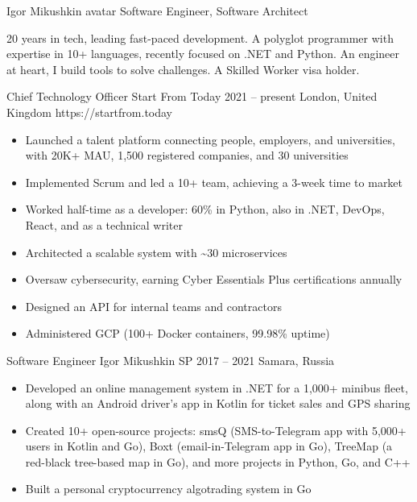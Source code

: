 \documentclass[9pt,a4paper]{juicv}
\begin{document}
\begin{paracol}{2}
\cvMakeHeader
    {Igor Mikushkin}
    {avatar}
    {Software Engineer, Software Architect}

    20 years in tech, leading fast-paced development.
    A polyglot programmer with expertise in 10+ languages, recently focused on .NET and Python.
    An engineer at heart, I build tools to solve challenges.
    A Skilled Worker visa holder.

    \cvLeftEvent
        {Chief Technology Officer}
        {Start From Today}
        {2021 -- present}
        {London, United Kingdom}
        {https://startfrom.today}

        \begin{itemize}
            \item Launched a talent platform connecting people, employers, and universities,
                  with 20K+ MAU, 1,500 registered companies, and 30 universities
            \item Implemented Scrum and led a 10+ team,
                  achieving a 3-week time to market
            \item Worked half-time as a developer: 60\% in Python,
                  also in .NET, DevOps, React, and as a technical writer
            \item Architected a scalable system with \textasciitilde 30 microservices
            \item Oversaw cybersecurity, earning Cyber Essentials Plus certifications annually
            \item Designed an API for internal teams and contractors
            \item Administered GCP (100+ Docker containers, 99.98\% uptime)
        \end{itemize}

    \cvLeftEvent
        {Software Engineer}
        {Igor Mikushkin SP}
        {2017 -- 2021}
        {Samara, Russia}
        {}

        \begin{itemize}
            \item Developed an online management system in .NET for a 1,000+ minibus fleet,
                  along with an Android driver’s app in Kotlin for ticket sales and GPS sharing
            \item Created 10+ open-source projects:
                  smsQ (SMS-to-Telegram app with 5,000+ users in Kotlin and Go),
                  Boxt (email-in-Telegram app in Go),
                  TreeMap (a red-black tree-based map in Go),
                  and more projects in Python, Go, and C++
            \item Built a personal cryptocurrency algotrading system in Go
        \end{itemize}


\end{paracol}
\end{document}
